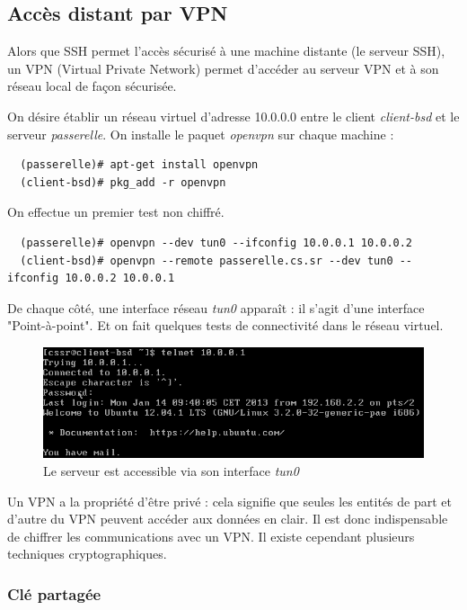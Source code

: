 \documentclass[a4paper]{article}
\begin{document}
\subsection{Accès distant par VPN}

Alors que SSH permet l'accès sécurisé à une machine distante (le serveur SSH),
un VPN (Virtual Private Network) permet d'accéder au serveur VPN et à son réseau local de façon sécurisée.

On désire établir un réseau virtuel d'adresse 10.0.0.0 entre le client \textit{client-bsd} 
et le serveur \textit{passerelle}. 
On installe le paquet \textit{openvpn} sur chaque machine :
\begin{verbatim}
  (passerelle)# apt-get install openvpn
  (client-bsd)# pkg_add -r openvpn
\end{verbatim}

On effectue un premier test non chiffré.
\begin{verbatim}
  (passerelle)# openvpn --dev tun0 --ifconfig 10.0.0.1 10.0.0.2
  (client-bsd)# openvpn --remote passerelle.cs.sr --dev tun0 --ifconfig 10.0.0.2 10.0.0.1
\end{verbatim}

De chaque côté, une interface réseau \textit{tun0} apparaît : il s'agit
d'une interface "Point-à-point".
Et on fait quelques tests de connectivité dans le réseau virtuel.

\begin{figure}[!ht]
	\centering
	\includegraphics[scale=.6]{Telnet_VPN.PNG}
	\caption{\label{telnet_vpn} Le serveur est accessible via son interface \textit{tun0}}
\end{figure}

Un VPN a la propriété d'être privé : cela signifie que seules les entités de part et
d'autre du VPN peuvent accéder aux données en clair. Il est donc
indispensable de chiffrer les communications avec un VPN. Il existe
cependant plusieurs techniques cryptographiques.

\subsubsection{Clé partagée} 
\end{document}
